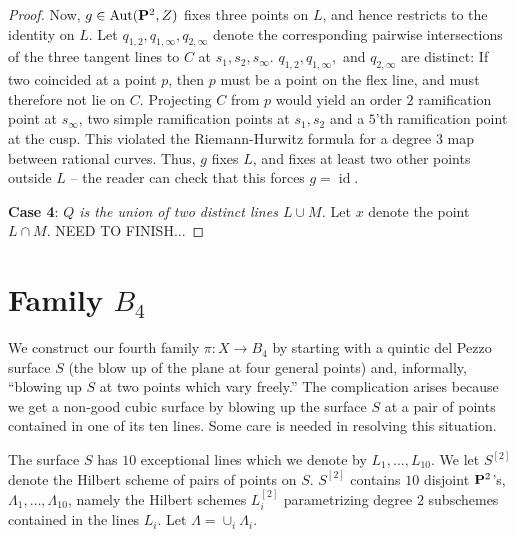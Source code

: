 \documentclass[12pt,reqno]{amsart}
\DeclareMathOperator{\id}{id}
\renewcommand{\to}{{\longrightarrow}}
\numberwithin{equation}{section}
\begin{document}
\begin{proof}
  Now, $g \in \Aut(\P^{2},Z)$ fixes three points on $L$, and hence
  restricts to the identity on $L$. Let
  $q_{1,2}, q_{1, \infty}, q_{2,\infty}$ denote the corresponding
  pairwise intersections of the three tangent lines to $C$ at
  $s_1, s_2, s_{\infty}$. $q_{1,2}, q_{1, \infty},$ and
  $ q_{2,\infty}$ are distinct: If two coincided at a point $p$, then
  $p$ must be a point on the flex line, and must therefore not lie on
  $C$. Projecting $C$ from $p$ would yield an order $2$ ramification
  point at $s_{\infty}$, two simple ramification points at
  $s_{1}, s_{2}$ and a $5$'th ramification point at the cusp.  This
  violated the Riemann-Hurwitz formula for a degree $3$ map between
  rational curves.  Thus, $g$ fixes $L$, and fixes at least two other
  points outside $L$ -- the reader can check that this forces
  $g = \id$.

  {\bf Case 4}: {\sl $Q$ is the union of two distinct lines
    $L \cup M$.}  Let $x$ denote the point $L \cap M$. NEED TO FINISH...
  
\end{proof}

  









\section{Family $B_4$}




\label{sec:family-b_4}

We construct our fourth family $\pi: X \to B_4$ by starting with a
quintic del Pezzo surface $S$ (the blow up of the plane at four
general points) and, informally, ``blowing up $S$ at two points which
vary freely.''  The complication arises because we get a non-good
cubic surface by blowing up the surface $S$ at a pair of points
contained in one of its ten lines.  Some care is needed in resolving
this situation.
 

The surface $S$ has $10$ exceptional lines which we denote by
$L_{1}, \dots, L_{10}$.  We let $S^{[2]}$ denote the Hilbert scheme of
pairs of points on $S$.  $S^{[2]}$ contains $10$ disjoint $\P^{2}$'s, 
$\Lambda_1, \dots, \Lambda_{10}$, namely the Hilbert schemes
$L_{i}^{[2]}$ parametrizing degree $2$ subschemes contained in the
lines $L_{i}$. Let $\Lambda = \cup_{i}\Lambda_{i}$.
\end{document}

